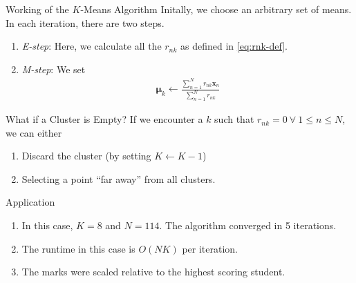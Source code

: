 \documentclass{beamer}
\providecommand{\brak}[1]{\ensuremath{\left(#1\right)}}
\theoremstyle{remark}
\renewcommand{\vec}[1]{\mathbf{\boldsymbol{#1}}}
\begin{document}
\begin{frame}{Working of the $K$-Means Algorithm}
    Initally, we choose an arbitrary set of means. In each iteration, there are 
    two steps.
    \pause
    \begin{enumerate}
        \item \textit{E-step}: Here, we calculate all the $r_{nk}$ as defined
            in \eqref{eq:rnk-def}.
        \pause
        \item \textit{M-step}: We set
            \begin{align}
                \vec{\mu}_k \leftarrow \frac{\sum_{n=1}^Nr_{nk}\vec{x}_n}{\sum_{n=1}^Nr_{nk}}
                \label{eq:M-step}
            \end{align}
        \pause
    \end{enumerate}
    \begin{alertblock}{What if a Cluster is Empty?}
        If we encounter a $k$ such that $r_{nk} = 0\ \forall\ 1 \le n \le 
        N$, we can either
        \pause
        \begin{enumerate}
            \item Discard the cluster (by setting $K \leftarrow K - 1$)
            \pause
            \item Selecting a point ``far away'' from all clusters.
        \end{enumerate}
    \end{alertblock}
\end{frame}

\begin{frame}{Application}
    \pause
    \begin{enumerate}
        \item In this case, $K = 8$ and $N = 114$. The algorithm converged in 5 iterations.
        \pause
        \item The runtime in this case is $O\brak{NK}$ per iteration.
        \pause
        \item The marks were scaled relative to the highest scoring student.    
    \end{enumerate}
\end{frame}
\end{document}
